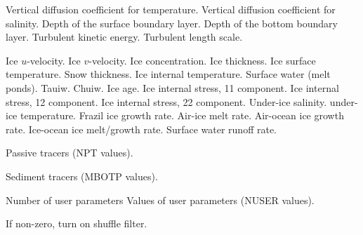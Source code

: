 \begin{klist}
\begin{klist}
          Vertical diffusion coefficient for
     temperature.
          Vertical diffusion coefficient for
     salinity.
          Depth of the surface boundary layer.
          Depth of the bottom boundary layer.
          Turbulent kinetic energy.
          Turbulent length scale.
     \end{klist}
    \mbox{}
     \begin{klist}
           Ice $u$-velocity.
           Ice $v$-velocity.
           Ice concentration.
           Ice thickness.
           Ice surface temperature.
           Snow thickness.
           Ice internal temperature.
           Surface water (melt ponds).
           Tauiw.
           Chuiw.
           Ice age.
           Ice internal stress, 11 component.
           Ice internal stress, 12 component.
           Ice internal stress, 22 component.
           Under-ice salinity.
           under-ice temperature.
           Frazil ice growth rate.
           Air-ice melt rate.
           Air-ocean ice growth rate.
           Ice-ocean ice melt/growth rate.
           Surface water runoff rate.
     \end{klist}
    \mbox{}
     \begin{klist}
           Passive tracers (NPT values).
     \end{klist}
    \mbox{}
     \begin{klist}
           Sediment tracers (MBOTP values).
     \end{klist}
    \mbox{}
     \begin{klist}
           Number of user parameters
            Values of user parameters (NUSER values).
     \end{klist}
    \mbox{}
     \begin{klist}
           If non-zero, turn on shuffle filter.

\end{klist}
\end{klist}
